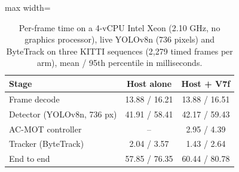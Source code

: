 \begin{table}[tbp]
\centering
\caption{Per-frame time on a 4-vCPU Intel Xeon (2.10 GHz, no graphics processor), live YOLOv8n (736 pixels) and ByteTrack on three KITTI sequences (2,279 timed frames per arm), mean / 95th percentile in milliseconds.}
\label{tab:ch5-runtime}
\small\setlength{\tabcolsep}{4pt}
\begin{adjustbox}{max width=\textwidth}
\begin{tabular}{lcc}
\hline
Stage & Host alone & Host + V7f \\
\hline
Frame decode & 13.88 / 16.21 & 13.88 / 16.51 \\
Detector (YOLOv8n, 736 px) & 41.91 / 58.41 & 42.17 / 59.43 \\
AC-MOT controller & -- & 2.95 / 4.39 \\
Tracker (ByteTrack) & 2.04 / 3.57 & 1.43 / 2.64 \\
End to end & 57.85 / 76.35 & 60.44 / 80.78 \\
\hline
\end{tabular}
\end{adjustbox}
\end{table}
